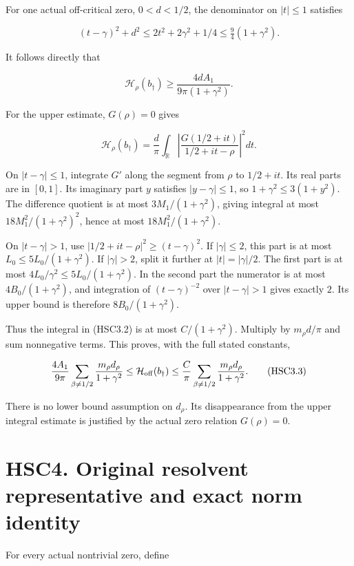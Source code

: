 For one actual off-critical zero, \(0<d<1/2\), the denominator on
\(|t|\le1\) satisfies

\[
 (t-\gamma)^2+d^2\le2t^2+2\gamma^2+1/4
 \le\tfrac94(1+\gamma^2).
\]

It follows directly that

\[
 \mathcal H_\rho(b_\dagger)
 \ge \frac{4d A_1}{9\pi(1+\gamma^2)}.
\tag{HSC3.1}
\]

For the upper estimate, \(G(\rho)=0\) gives

\[
 \mathcal H_\rho(b_\dagger)
 =\frac d\pi\int_{\mathbb R}
 \left|\frac{G(1/2+it)}{1/2+it-\rho}\right|^2dt.
\tag{HSC3.2}
\]

On \(|t-\gamma|\le1\), integrate \(G'\) along the segment from \(\rho\)
to \(1/2+it\). Its real parts are in \([0,1]\). Its imaginary part \(y\)
satisfies \(|y-\gamma|\le1\), so \(1+\gamma^2\le3(1+y^2)\). The
difference quotient is at most \(3M_1/(1+\gamma^2)\), giving integral at
most \(18M_1^2/(1+\gamma^2)^2\), hence at most \(18M_1^2/(1+\gamma^2)\).

On \(|t-\gamma|>1\), use \(|1/2+it-\rho|^2\ge(t-\gamma)^2\). If
\(|\gamma|\le2\), this part is at most \(L_0\le5L_0/(1+\gamma^2)\). If
\(|\gamma|>2\), split it further at \(|t|=|\gamma|/2\). The first part
is at most \(4L_0/\gamma^2\le5L_0/(1+\gamma^2)\). In the second part the
numerator is at most \(4B_0/(1+\gamma^2)\), and integration of
\((t-\gamma)^{-2}\) over \(|t-\gamma|>1\) gives exactly \(2\). Its upper
bound is therefore \(8B_0/(1+\gamma^2)\).

Thus the integral in (HSC3.2) is at most \(C/(1+\gamma^2)\). Multiply by
\(m_\rho d/\pi\) and sum nonnegative terms. This proves, with the full
stated constants,

\[
 \frac{4A_1}{9\pi}\sum_{\beta\ne1/2}
 \frac{m_\rho d_\rho}{1+\gamma^2}
 \le \mathcal H_{\rm off}(b_\dagger)
 \le\frac C\pi\sum_{\beta\ne1/2}
 \frac{m_\rho d_\rho}{1+\gamma^2}.
\tag{HSC3.3}
\]

There is no lower bound assumption on \(d_\rho\). Its disappearance from
the upper integral estimate is justified by the actual zero relation
\(G(\rho)=0\).

\section{HSC4. Original resolvent representative and exact norm
identity}\label{hsc4.-original-resolvent-representative-and-exact-norm-identity}

For every actual nontrivial zero, define

